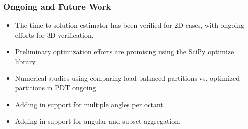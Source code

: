 \documentclass[xcolor={usenames,dvipsnames,svgnames,table}]{beamer}
\begin{document}
\begin{frame}[t]\frametitle{Ongoing and Future Work}
  \begin{block}{}
    \begin{itemize}
      \item The time to solution estimator has been verified for 2D cases, with ongoing efforts for 3D verification.
      \item Preliminary optimization efforts are promising using the SciPy optimize library.  
      \item Numerical studies using comparing load balanced partitions vs. optimized partitions in PDT ongoing.
      \item Adding in support for multiple angles per octant. 
      \item Adding in support for angular and subset aggregation.
    \end{itemize}
  \end{block}
\end{frame}
\end{document}
